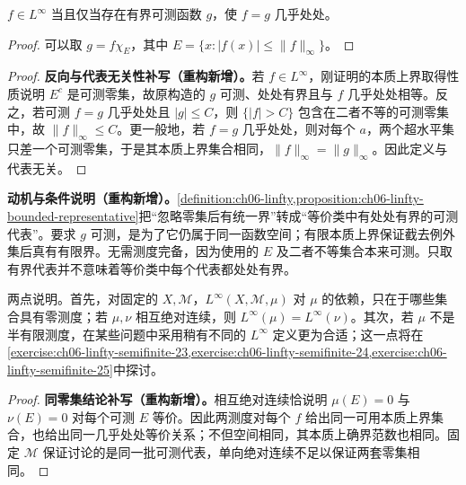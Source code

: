 \documentclass[../../main.tex]{subfiles}
\begin{document}
\begin{proposition}\label{proposition:ch06-linfty-bounded-representative}
$f\in L^\infty$ 当且仅当存在有界可测函数 $g$，使 $f=g$ 几乎处处。
\end{proposition}
\begin{proof}
可以取 $g=f\chi_E$，其中 $E=\{x:|f(x)|\leqslant\|f\|_\infty\}$。
\end{proof}
\begin{proof}
\textbf{反向与代表无关性补写（重构新增）。}若 $f\in L^\infty$，刚证明的本质上界取得性质说明 $E^c$ 是可测零集，故原构造的 $g$ 可测、处处有界且与 $f$ 几乎处处相等。反之，若可测 $f=g$ 几乎处处且 $|g|\leqslant C$，则 $\{|f|>C\}$ 包含在二者不等的可测零集中，故 $\|f\|_\infty\leqslant C$。更一般地，若 $f=g$ 几乎处处，则对每个 $a$，两个超水平集只差一个可测零集，于是其本质上界集合相同，$\|f\|_\infty=\|g\|_\infty$。因此定义与代表无关。
\end{proof}
\begin{remark}
\textbf{动机与条件说明（重构新增）。}\cref{definition:ch06-linfty,proposition:ch06-linfty-bounded-representative}把“忽略零集后有统一界”转成“等价类中有处处有界的可测代表”。要求 $g$ 可测，是为了它仍属于同一函数空间；有限本质上界保证截去例外集后真有有限界。无需测度完备，因为使用的 $E$ 及二者不等集合本来可测。只取有界代表并不意味着等价类中每个代表都处处有界。
\end{remark}
\begin{remark}
两点说明。首先，对固定的 $X,\mathscr M$，$L^\infty(X,\mathscr M,\mu)$ 对 $\mu$ 的依赖，只在于哪些集合具有零测度；若 $\mu,\nu$ 相互绝对连续，则 $L^\infty(\mu)=L^\infty(\nu)$。其次，若 $\mu$ 不是半有限测度，在某些问题中采用稍有不同的 $L^\infty$ 定义更为合适；这一点将在\cref{exercise:ch06-linfty-semifinite-23,exercise:ch06-linfty-semifinite-24,exercise:ch06-linfty-semifinite-25}中探讨。
\end{remark}
\begin{proof}
\textbf{同零集结论补写（重构新增）。}相互绝对连续恰说明 $\mu(E)=0$ 与 $\nu(E)=0$ 对每个可测 $E$ 等价。因此两测度对每个 $f$ 给出同一可用本质上界集合，也给出同一几乎处处等价关系；不但空间相同，其本质上确界范数也相同。固定 $\mathscr M$ 保证讨论的是同一批可测代表，单向绝对连续不足以保证两套零集相同。
\end{proof}
\end{document}
